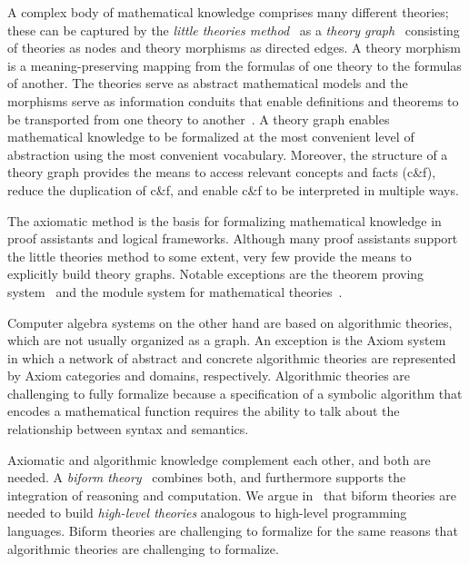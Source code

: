 \documentclass[fleqn]{llncs}
\begin{document}
A complex body of mathematical knowledge comprises many different
theories; these can be captured by the
\emph{little theories method}~\cite{FarmerEtAl92b} as a \emph{theory
  graph}~\cite{Kohlhase14} consisting of theories as nodes and theory
morphisms as directed edges.  A theory morphism is a
meaning-preserving mapping from the formulas of one theory to the
formulas of another.  The theories serve as abstract
mathematical models and the morphisms serve as information
conduits that enable definitions and theorems to be transported
from one theory to another~\cite{BarwiseSeligman97}.  A theory graph enables
mathematical knowledge to be formalized at the most convenient level
of abstraction using the most convenient vocabulary.  Moreover, the
structure of a theory graph provides the means to access relevant
concepts and facts (c\&f), reduce the duplication of c\&f, and
enable c\&f to be interpreted in multiple ways.

The axiomatic method is the basis for formalizing mathematical
knowledge in proof assistants and logical frameworks.  Although many
proof assistants support the little theories method to some extent,
very few provide the means to explicitly build theory graphs.  Notable
exceptions are the {\imps} theorem proving system~\cite{FarmerEtAl93}
and the {\mmt} module system for mathematical
theories~\cite{RabeKohlhase13}.

Computer algebra systems on the other hand are based on
algorithmic theories, which are not usually
organized as a graph.  An exception is the
Axiom system~\cite{JenksSutor92} in which a
network of abstract and concrete algorithmic theories are represented
by Axiom categories and domains, respectively.  Algorithmic theories
are challenging to fully formalize because a specification of
a symbolic algorithm that encodes a mathematical function requires
the ability to talk about the relationship between syntax and
semantics.

Axiomatic and algorithmic knowledge complement each other, and
both are needed.  A \emph{biform theory}~\cite{CaretteFarmer08,Farmer07b} 
combines both, and furthermore supports the
integration of reasoning and computation.  We argue
in~\cite{CaretteFarmer08} that biform theories are needed to build
\emph{high-level theories} analogous to high-level programming
languages.  Biform theories are challenging to formalize for the same
reasons that algorithmic theories are challenging to formalize.
\end{document}
